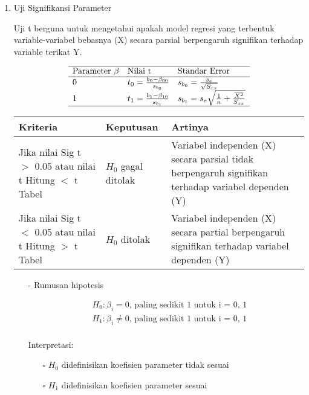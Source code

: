 \begin{enumerate}
\item Uji Signifikansi Parameter \\
\begin{sloppypar}
Uji t berguna untuk mengetahui apakah model regresi yang terbentuk variable-variabel bebasnya (X) secara parsial berpengaruh signifikan terhadap variable terikat Y.
\end{sloppypar}
$$\begin{array}{lll}
    \hline 
    \text{Parameter }\beta & \text {Nilai t} & \text {Standar Error} \\
    \hline 
    0 & t_0 = \frac{b_0 - \beta_{00}}{s_{b_0}} & s_{b_0} = \frac{s_e}{\sqrt{S_{xx}}} \\
    1 & t_1 = \frac{b_1 - \beta_{10}}{s_{b_1}} & s_{b_1} = s_e \sqrt{\frac{1}{n} + \frac{\overline{X^2}}{S_{xx}}} \\
    \hline
\end{array}$$
\begin{table}[h!]
    \begin{tabular}{p{4cm} p{2.5cm} p{6cm}}
        \toprule
\textbf{Kriteria} & \textbf{Keputusan} & \textbf{Artinya} \\ 
\midrule
Jika nilai Sig t $>$ 0.05 atau nilai t Hitung $<$ t Tabel
& $H_0$ gagal ditolak 
& Variabel independen (X) secara parsial tidak berpengaruh signifikan terhadap variabel dependen (Y) \\     
Jika nilai Sig t $<$ 0.05 atau nilai t Hitung $>$ t Tabel
& $H_0$ ditolak       
& Variabel independen (X) secara partial berpengaruh signifikan terhadap variabel dependen (Y) \\
        \bottomrule
    \end{tabular}
\end{table}
\begin{test}{
    \begin{enumerate}
    \item[-] Rumusan hipotesis \\
    \begin{fleqn}[\parindent]
        \begin{equation*}
        \begin{split}
        &H_0 : \beta_i = 0 \text{, paling sedikit 1 untuk i = 0, 1} \\ 
        &H_1 : \beta_i \neq 0 \text{, paling sedikit 1 untuk i = 0, 1}\\
        \end{split}
        \end{equation*}
    \end{fleqn}
    Interpretasi:
    \begin{enumerate}
    \item[$\square$] $H_0$ didefinisikan koefisien parameter tidak sesuai
    \item[$\square$] $H_1$ didefinisikan koefisien parameter sesuai
    \end{enumerate}


\end{enumerate}}
\end{test}
\end{enumerate}
